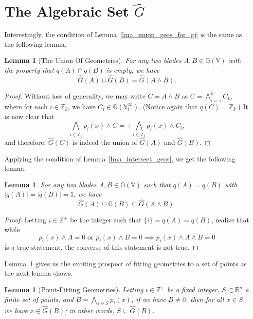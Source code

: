 \documentclass{birkjour}
\newtheorem{lem}[thm]{Lemma}
\theoremstyle{definition}
\theoremstyle{remark}
\numberwithin{equation}{section}
\newcommand{\G}{\mathbb{G}}
\newcommand{\V}{\mathbb{V}}
\newcommand{\R}{\mathbb{R}}
\newcommand{\Z}{\mathbb{Z}}
\newcommand{\Go}{\hat{G}}
\begin{document}

\section{The Algebraic Set $\Go$}

Interestingly, the condition of Lemma~\ref{lma_union_geos_for_gi} is the same
as the following lemma.
\begin{lem}[The Union Of Geometries]\label{lma_union_geos_for_go}
For any two blades $A,B\in\G(\V)$ with the property that $q(A)\cap q(B)$ is empty,
we have
\begin{equation}
\Go(A)\cup\Go(B)=\Go(A\wedge B).
\end{equation}
\end{lem}
\begin{proof}
Without loss of generality, we may write $C=A\wedge B$ as $C=\bigwedge_{i=1}^k C_k$,
where for each $i\in\Z_k$, we have $C_i\in\G(\V_i^\infty)$.  (Notice again that $q(C)=\Z_k$.)
It is now clear that
\begin{equation}
\bigwedge_{i\in\Z_k}p_i(x)\wedge C=\pm\bigwedge_{i\in\Z_k}p_i(x)\wedge C_i,
\end{equation}
and therefore, $\Go(C)$ is indeed the union of $\Go(A)$ and $\Go(B)$.
\end{proof}
Applying the condition of Lemma~\ref{lma_intersect_geos}, we get the
following lemma.
\begin{lem}\label{lma_combine_geos}
For any two blades $A,B\in\G(\V)$ such that $q(A)=q(B)$
with $|q(A)|=|q(B)|=1$, we have
\begin{equation}
\Go(A)\cup\G(B)\subseteq\Go(A\wedge B).
\end{equation}
\end{lem}
\begin{proof}
Letting $i\in\Z^+$ be the integer such that $\{i\}=q(A)=q(B)$, realize that while
\begin{equation}
\mbox{$p_i(x)\wedge A=0$ or $p_i(x)\wedge B=0\implies p_i(x)\wedge A\wedge B=0$}
\end{equation}
is a true statement, the converse of this statement is not true.
\end{proof}
Lemma~\ref{lma_combine_geos} gives us the exciting prospect of fitting
geometries to a set of points as the next lemma shows.
\begin{lem}[Point-Fitting Geometries]\label{lma_point_fitting}
Letting $i\in\Z^+$ be a fixed integer, $S\subset\R^n$ a finite set
of points, and $B=\bigwedge_{x\in S} p_i(x)$, if we have $B\neq 0$,
then for all $x\in S$, we have $x\in\Go(B)$; in other words, $S\subseteq\Go(B)$.
\end{lem}
\end{document}
